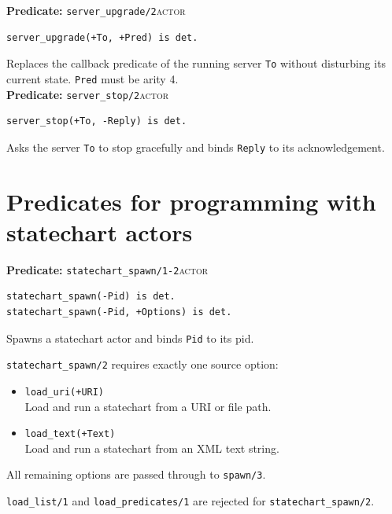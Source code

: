 \bigskip
\noindent \textbf{Predicate:} \texttt{server\_upgrade/2}\hfill\textsc{actor}

\begin{verbatim}
server_upgrade(+To, +Pred) is det.
\end{verbatim}

\noindent Replaces the callback predicate of the running server \texttt{To}
without disturbing its current state. \texttt{Pred} must be arity 4.\\

\bigskip
\noindent \textbf{Predicate:} \texttt{server\_stop/2}\hfill\textsc{actor}

\begin{verbatim}
server_stop(+To, -Reply) is det.
\end{verbatim}

\noindent Asks the server \texttt{To} to stop gracefully and binds
\texttt{Reply} to its acknowledgement.\\

\section{Predicates for programming with statechart actors}\label{sec:statechart-api}

\noindent \textbf{Predicate:} \texttt{statechart\_spawn/1-2}\hfill\textsc{actor}

\begin{verbatim}
statechart_spawn(-Pid) is det.
statechart_spawn(-Pid, +Options) is det.
\end{verbatim}

\noindent Spawns a statechart actor and binds \texttt{Pid} to its pid.

\medskip
\noindent \texttt{statechart\_spawn/2} requires exactly one source option:

\begin{itemize}
\item
  \texttt{load\_uri(+URI)}\\
  Load and run a statechart from a URI or file path.
\item
  \texttt{load\_text(+Text)}\\
  Load and run a statechart from an XML text string.
\end{itemize}

\noindent All remaining options are passed through to \texttt{spawn/3}.

\medskip
\noindent \texttt{load\_list/1} and \texttt{load\_predicates/1} are rejected
for \texttt{statechart\_spawn/2}.\\

